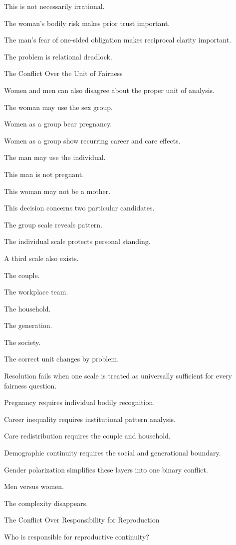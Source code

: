 This is not necessarily irrational.

The woman’s bodily risk makes prior trust important.

The man’s fear of one-sided obligation makes reciprocal clarity important.

The problem is relational deadlock.

The Conflict Over the Unit of Fairness

Women and men can also disagree about the proper unit of analysis.

The woman may use the sex group.

Women as a group bear pregnancy.

Women as a group show recurring career and care effects.

The man may use the individual.

This man is not pregnant.

This woman may not be a mother.

This decision concerns two particular candidates.

The group scale reveals pattern.

The individual scale protects personal standing.

A third scale also exists.

The couple.

The workplace team.

The household.

The generation.

The society.

The correct unit changes by problem.

Resolution fails when one scale is treated as universally sufficient for every fairness question.

Pregnancy requires individual bodily recognition.

Career inequality requires institutional pattern analysis.

Care redistribution requires the couple and household.

Demographic continuity requires the social and generational boundary.

Gender polarization simplifies these layers into one binary conflict.

Men versus women.

The complexity disappears.

The Conflict Over Responsibility for Reproduction

Who is responsible for reproductive continuity?

